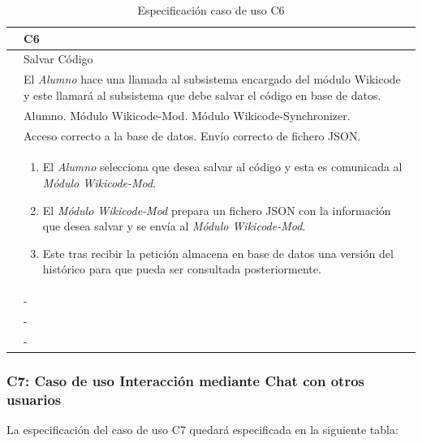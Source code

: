 \begin{table}[h]
\centering
\begin{tabular}{ | p{} | p{} | }
	\hline
	\cellcolor[gray]{.8}{ID} & C6 \\
	\hline 
	\cellcolor[gray]{.8}{Nombre} & Salvar Código \\
	\hline
	\cellcolor[gray]{.8}{Descripción} & El \emph{Alumno} hace una llamada al subsistema encargado del módulo Wikicode y este llamará al subsistema que debe salvar el código en base de datos. \\
	\hline
	\cellcolor[gray]{.8}{Actores} &  Alumno. Módulo Wikicode-Mod. Módulo Wikicode-Synchronizer.\\
	\hline
	\cellcolor[gray]{.8}{Asunciones} & Acceso correcto a la base de datos. Envío correcto de fichero JSON. \\
	\hline
	\cellcolor[gray]{.8}{Pasos} & \begin{enumerate}
		\item El \emph{Alumno} selecciona que desea salvar al código y esta es comunicada al \emph{Módulo Wikicode-Mod}.
		\item El \emph{Módulo Wikicode-Mod} prepara un fichero JSON con la información que desea salvar y se envía al \emph{Módulo Wikicode-Mod}. 
		\item Este tras recibir la petición almacena en base de datos una versión del histórico para que pueda ser consultada posteriormente. 
		\end{enumerate} \\
	\hline
	\cellcolor[gray]{.8}{Variaciones} & - \\
	\hline
	\cellcolor[gray]{.8}{Requisitos no funcionales} & - \\
	\hline
	\cellcolor[gray]{.8}{Cuestiones} & - \\
	\hline
	
\end{tabular}
\caption{Especificación caso de uso C6}
\end{table}

\newpage
\subsubsection{C7: Caso de uso Interacción mediante Chat con otros usuarios}

La especificación del caso de uso C7 quedará especificada en la siguiente tabla:

